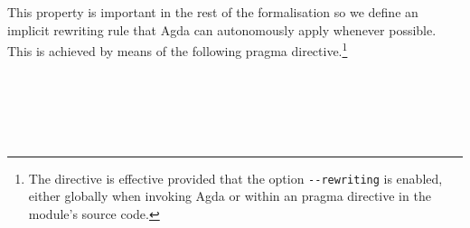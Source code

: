 This property is important in the rest of the formalisation so we define an
implicit rewriting rule that Agda can autonomously apply whenever possible. This
is achieved by means of the following pragma directive.\footnote{The directive
is effective provided that the option \texttt{{-}{-}rewriting} is enabled,
either globally when invoking Agda or within an  pragma
directive in the module's source code.}

\begin{code}%
\>[0]\AgdaSymbol{\{-\#}\AgdaSpace{}%
\AgdaSpace{}%
\AgdaSpace{}%
\AgdaSymbol{\#-\}}\<%
\end{code}

\begin{code}[hide]%
\>[0]\AgdaSpace{}%
\AgdaSymbol{:}\AgdaSpace{}%
\AgdaSpace{}%
\AgdaSymbol{\}}\AgdaSpace{}%
\AgdaSpace{}%
\AgdaSymbol{(}\AgdaSpace{}%
\AgdaSpace{}%
\AgdaSpace{}%
\AgdaSpace{}%
\AgdaSymbol{)}\AgdaSpace{}%
\AgdaSpace{}%
\AgdaSpace{}%
\AgdaSymbol{(}\AgdaSpace{}%
\AgdaSymbol{)}\AgdaSpace{}%
\AgdaSpace{}%
\AgdaSpace{}%
\AgdaSymbol{(}\AgdaSpace{}%
\AgdaSymbol{)}\<%
\\
\>[0]\AgdaSpace{}%
\AgdaSpace{}%
\AgdaSpace{}%
\AgdaSymbol{=}\AgdaSpace{}%
\<%
\\
\>[0]\AgdaSpace{}%
\AgdaSpace{}%
\AgdaSymbol{(}\AgdaSpace{}%
\AgdaSymbol{)}\AgdaSpace{}%
\AgdaSymbol{=}\AgdaSpace{}%
\AgdaSpace{}%
\AgdaSymbol{(}\AgdaSpace{}%
\AgdaSymbol{)}\<%
\\
%
\\[\AgdaEmptyExtraSkip]%
\>[0]\AgdaSpace{}%
\AgdaSymbol{:}\AgdaSpace{}%
\AgdaSpace{}%
\AgdaSymbol{\}}\AgdaSpace{}%
\AgdaSpace{}%
\AgdaSymbol{(}\AgdaSpace{}%
\AgdaSpace{}%
\AgdaSpace{}%
\AgdaSpace{}%
\AgdaSymbol{)}\AgdaSpace{}%
\AgdaSpace{}%
\AgdaSpace{}%
\AgdaSpace{}%
\AgdaSpace{}%

\end{code}
